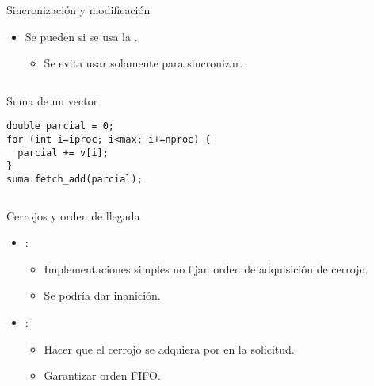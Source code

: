 \begin{frame}[t,fragile]{Sincronización y modificación}
\begin{itemize}
  \item Se pueden  si se usa 
        la .
    \begin{itemize}
      \item Se evita usar  solamente para sincronizar.
    \end{itemize}
\end{itemize}


\begin{columns}

\begin{block}{Suma de un vector}
\begin{lstlisting}
double parcial = 0;
for (int i=iproc; i<max; i+=nproc) {
  parcial += v[i];
}
suma.fetch_add(parcial);
\end{lstlisting}
\end{block}

\end{columns}
\end{frame}

\begin{frame}[t]{Cerrojos y orden de llegada}
\begin{itemize}
  \item {}:
    \begin{itemize}
      \item Implementaciones simples no fijan orden de adquisición de cerrojo.
      \item Se podría dar inanición.
    \end{itemize}

  \item {}:
    \begin{itemize}
      \item Hacer que el cerrojo se adquiera por  en la solicitud.
      \item Garantizar orden FIFO.
    \end{itemize}

\end{itemize}
\end{frame}

